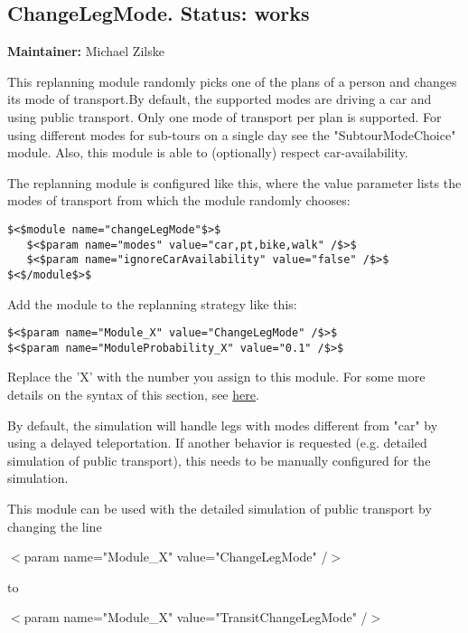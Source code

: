\documentclass[a4paper,11pt]{report}
\begin{document}
\subsection{ChangeLegMode. Status: works}


\textbf{Maintainer:} Michael Zilske

This replanning module randomly picks one of the plans of a person  and changes its mode of transport.By default, the supported modes  are driving a car and using public transport. Only one mode of transport  per plan is supported. For using different modes for sub-tours on a  single day see the "SubtourModeChoice" module. Also, this module is able  to (optionally) respect car-availability.

The replanning module is configured like this, where the value  parameter lists the modes of transport from which the module randomly  chooses:
\begin{verbatim}
$<$module name="changeLegMode"$>$
   $<$param name="modes" value="car,pt,bike,walk" /$>$
   $<$param name="ignoreCarAvailability" value="false" /$>$
$<$/module$>$
\end{verbatim}

Add the module to the replanning strategy like this:
\begin{verbatim}
$<$param name="Module_X" value="ChangeLegMode" /$>$
$<$param name="ModuleProbability_X" value="0.1" /$>$
\end{verbatim}

Replace the 'X' with the number you assign to this module. For some more details on the syntax of this section, see \href{http://matsim.org/node/478}{here}.

By default, the simulation will handle legs with modes different from  "car" by using a delayed teleportation. If another behavior is  requested (e.g. detailed simulation of public transport), this needs to  be manually configured for the simulation.

This module can be used with the detailed simulation of public transport by changing the line

$<$param name="Module\_X" value="ChangeLegMode" /$>$

to

$<$param name="Module\_X" value="TransitChangeLegMode" /$>$
\end{document}
